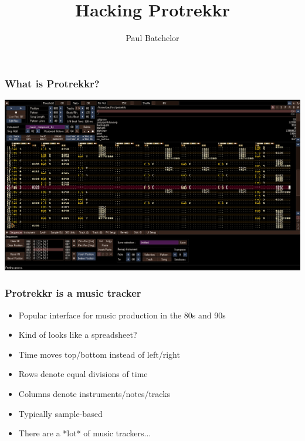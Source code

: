 \documentclass{beamer}
\title{Hacking Protrekkr}
\author{Paul Batchelor}
\begin{document}
\begin{frame}
\maketitle
\end{frame}

\begin{frame}
\frametitle{What is Protrekkr?}
\includegraphics[scale=0.25]{../ptk}
\end{frame}

% 
% 

\begin{frame}

\frametitle{Protrekkr is a music tracker}
\begin{itemize}
    \item{Popular interface for music production in the 80s and 90s}
    \item{Kind of looks like a spreadsheet?}
    \item{Time moves top/bottom instead of left/right}
    \item{Rows denote equal divisions of time}
    \item{Columns denote instruments/notes/tracks}
    \item{Typically sample-based}
    \item{There are a *lot* of music trackers...}
\end{itemize}

\end{frame}
\end{document}
